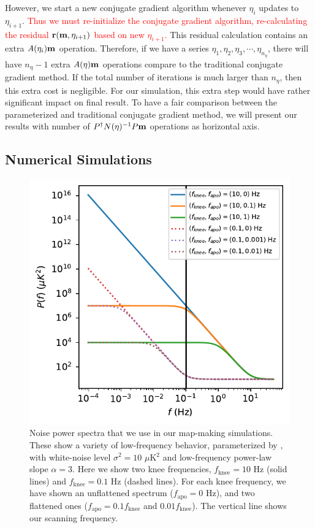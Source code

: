 \documentclass[twocolumn,linenumbers]{aastex631}
\newcommand{\Eq}[1]{\text{Eq.\,\ref{#1}}}
\newcommand{\vbm}{\vb{m}}
\newcommand{\inv}[1]{#1^{-1}}
\newcommand{\Pdagger}{P^{\dagger}}
\newcommand{\kmh}[1]{\textcolor{red}{#1}}
\begin{document}
However, we start a new conjugate gradient algorithm whenever $\eta_i$ updates to $\eta_{i+1}$.
\kmh{
Thus we must re-initialize the conjugate gradient algorithm, re-calculating the residual $\vb{r}(\vbm, \eta_{i+1})$ based on new $\eta_{i+1}$.  
}
This residual calculation contains an extra $A(\eta_i) \vbm$ operation.
Therefore, if we have a series $\eta_1, \eta_2, \eta_3, \cdots, \eta_{n_{\eta}}$,
there will have $n_{\eta}-1$ extra $A(\eta) \vbm$ operations compare to {the} traditional conjugate gradient
method.
If the total number of iterations is much larger than $n_{\eta}$,
then this extra cost is negligible.
For our simulation, this extra step would have rather significant impact on final result.
To have a fair comparison between the parameterized and traditional conjugate gradient method,
we will present our results with number of $\Pdagger \inv{N(\eta)} P\vbm$ operations as horizontal axis.



\subsection{Numerical Simulations}

\begin{figure}[tb!]
\includegraphics[width=\linewidth]{P_f.pdf}
\centering
\caption{Noise power spectra that we use in our map-making simulations.  These show a variety of low-frequency behavior, parameterized by \Eq{noise power spectrum}, with 
    white-noise level $\sigma^2 = 10$ $\mu$K$^2$ and low-frequency power-law slope $\alpha = 3$.
    Here we show two knee frequencies, $f_\text{knee}=10$ Hz (solid lines)  
    and $f_\text{knee}=0.1$ Hz (dashed lines).
    For each knee frequency, we have shown an unflattened spectrum ($f_\text{apo}=0$ Hz), and two flattened ones ($f_\text{apo}=0.1f_\text{knee}$ and
    $0.01f_\text{knee}$).
    The vertical line shows our scanning frequency.
}
\label{power spectrum}
\end{figure}
\end{document}
